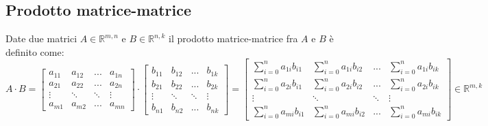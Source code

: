 \documentclass{article}
\begin{document}
\subsection{Prodotto matrice-matrice}
    Date due matrici $A \in \mathbb{R}^{m, n}$ e $B \in \mathbb{R}^{n, k}$ il prodotto matrice-matrice fra $A$ e $B$ è definito come:
    \[
        A \cdot B = 
        \begin{bmatrix}
            a_{11} & a_{12} & ... & a_{1n} \\
            a_{21} & a_{22} & ... & a_{2n} \\
            \vdots & \ddots & \ddots & \vdots \\
            a_{m1} & a_{m2} & ... & a_{mn} 
        \end{bmatrix}
        \cdot 
        \begin{bmatrix}
            b_{11} & b_{12} & ... & b_{1k} \\
            b_{21} & b_{22} & ... & b_{2k} \\
            \vdots & \ddots & \ddots & \vdots \\
            b_{n1} & b_{n2} & ... & b_{nk} 
        \end{bmatrix}
        = 
        \begin{bmatrix}
            \displaystyle\sum_{i = 0}^{n}{a_{1i} b_{i1}} & \displaystyle\sum_{i = 0}^{n}{a_{1i} b_{i2}} & ... & \displaystyle\sum_{i = 0}^{n}{a_{1i} b_{ik}} \\
            \displaystyle\sum_{i = 0}^{n}{a_{2i} b_{i1}} & \displaystyle\sum_{i = 0}^{n}{a_{2i} b_{i2}} & ... & \displaystyle\sum_{i = 0}^{n}{a_{2i} b_{ik}} \\
            \vdots & \ddots & \ddots & \vdots \\
            \displaystyle\sum_{i = 0}^{n}{a_{mi} b_{i1}} & \displaystyle\sum_{i = 0}^{n}{a_{mi} b_{i2}} & ... & \displaystyle\sum_{i = 0}^{n}{a_{mi} b_{ik}} 
        \end{bmatrix}
        \in \mathbb{R}^{m, k}
    \]
\end{document}
